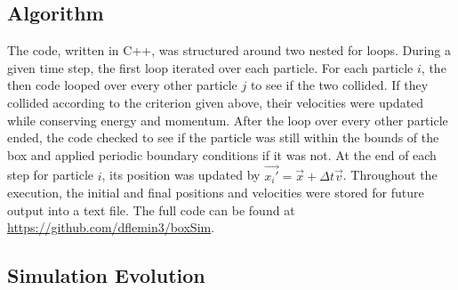 \documentclass[12pt]{amsart}
\begin{document}
\subsection{Algorithm}

The code, written in C++, was structured around two nested for loops.  During a given time step, the first loop iterated over each particle.  For each particle $i$, the then code looped over every other particle $j$ to see if the two collided.  If they collided according to the criterion given above, their velocities were updated while conserving energy and momentum.  After the loop over every other particle ended, the code checked to see if the particle was still within the bounds of the box and applied periodic boundary conditions if it was not.  At the end of each step for particle $i$, its position was updated by $\vec{x_i'} = \vec{x} + \Delta t \vec{v}$.  Throughout the execution, the initial and final positions and velocities were stored for future output into a text file.  The full code can be found at \href{https://github.com/dflemin3/boxSim}{https://github.com/dflemin3/boxSim}.

\subsection{Simulation Evolution}
\end{document}
